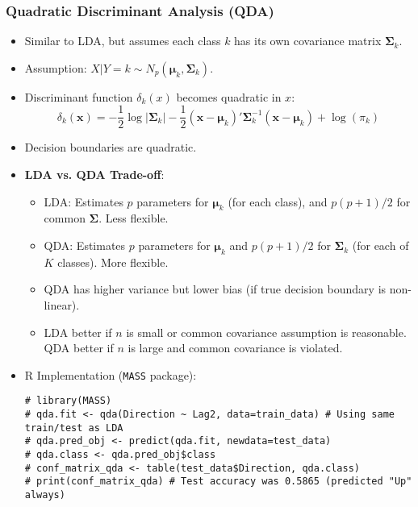 \documentclass[12pt,a4paper]{article}
\newcommand{\Rpackage}[1]{\texttt{#1}} %
\begin{document}
\begin{itemize}
    \subsubsection{Quadratic Discriminant Analysis (QDA)}
        \begin{itemize}
            \item Similar to LDA, but assumes each class $k$ has its own covariance matrix $\boldsymbol{\Sigma}_k$.
            \item Assumption: $X|Y=k \sim N_p(\boldsymbol{\mu}_k, \boldsymbol{\Sigma}_k)$.
            \item Discriminant function $\delta_k(x)$ becomes quadratic in $x$:
                $$ \delta_k(\mathbf{x}) = -\frac{1}{2}\log|\boldsymbol{\Sigma}_k| - \frac{1}{2}(\mathbf{x}-\boldsymbol{\mu}_k)'\boldsymbol{\Sigma}_k^{-1}(\mathbf{x}-\boldsymbol{\mu}_k) + \log(\pi_k) $$
            \item Decision boundaries are quadratic.
            \item \textbf{LDA vs. QDA Trade-off}:
                \begin{itemize}
                    \item LDA: Estimates $p$ parameters for $\boldsymbol{\mu}_k$ (for each class), and $p(p+1)/2$ for common $\boldsymbol{\Sigma}$. Less flexible.
                    \item QDA: Estimates $p$ parameters for $\boldsymbol{\mu}_k$ and $p(p+1)/2$ for $\boldsymbol{\Sigma}_k$ (for each of $K$ classes). More flexible.
                    \item QDA has higher variance but lower bias (if true decision boundary is non-linear).
                    \item LDA better if $n$ is small or common covariance assumption is reasonable. QDA better if $n$ is large and common covariance is violated.
                \end{itemize}
            \item R Implementation (\Rpackage{MASS} package):
\begin{lstlisting}[caption={QDA on Weekly Data (from ex4.13.R)}]
# library(MASS)
# qda.fit <- qda(Direction ~ Lag2, data=train_data) # Using same train/test as LDA
# qda.pred_obj <- predict(qda.fit, newdata=test_data)
# qda.class <- qda.pred_obj$class
# conf_matrix_qda <- table(test_data$Direction, qda.class)
# print(conf_matrix_qda) # Test accuracy was 0.5865 (predicted "Up" always)
\end{lstlisting}
        \end{itemize}


\end{itemize}
\end{document}
